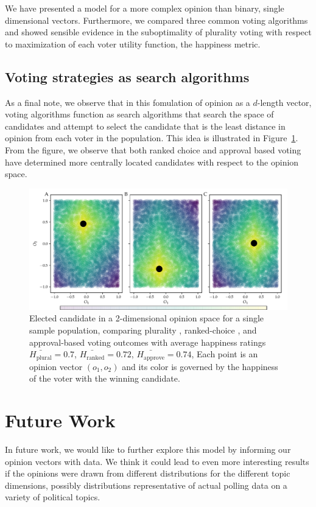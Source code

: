 We have presented a model for a more complex opinion than binary, single dimensional vectors. Furthermore, we compared three
common voting algorithms and showed sensible evidence in the suboptimality of plurality voting with respect to maximization
of each voter utility function, the happiness metric.

\subsection{Voting strategies as search algorithms}
As a final note, we observe that in this fomulation of opinion as a $d$-length vector, voting algorithms function as search algorithms
that search the space of candidates and attempt to select the candidate that is the least distance in opinion from each voter
in the population.  This idea is illustrated in Figure~\ref{fig:plurality_vs_rc_anecdotal}. From the figure, we observe that both
ranked choice and approval based voting have determined more centrally located candidates with respect to the opinion space. 
\begin{figure}
\includegraphics[width=1\textwidth]{figs/rc-gen_anecdotal_comparison-2D.pdf}\vspace{-3mm}
\caption{Elected candidate in a 2-dimensional opinion space for a single sample population, comparing plurality ,
ranked-choice , and approval-based  voting outcomes with average happiness ratings 
$\bar{H_{\mathrm{plural}}}=0.7$, $\bar{H_{\mathrm{ranked}}}=0.72$, $\bar{H_{\mathrm{approve}}}=0.74$, 
Each point is an opinion vector $(o_1, o_2)$ and its color is governed by the happiness of the voter with the winning candidate.}
\label{fig:plurality_vs_rc_anecdotal}
\end{figure}
\section{Future Work}
In future work, we would like to further explore this model by informing our opinion vectors with data.
We think it could lead to even more interesting results if the opinions were drawn from different distributions for the different topic dimensions, possibly distributions representative of actual polling data on a variety of political topics.


